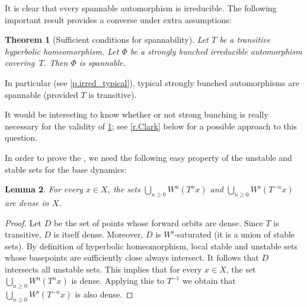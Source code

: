 \documentclass[JEP,XML,SOM,Unicode]{cedram}
\theoremstyle{plain}
\newtheorem{theorem}{Theorem}[section]
\newtheorem{lemma}[theorem]{Lemma}
\theoremstyle{definition}
\newcommand{\uu}{\mathrm{u}}
\renewcommand{\ss}{\mathrm{s}}
\begin{document}
It is clear that every spannable automorphism is irreducible.
The following important result provides a converse under extra assumptions:

\begin{theorem}[Sufficient conditions for spannability]\label{t.irr_to_span}
Let $T$ be a transitive hyperbolic homeomorphism.
Let $\Phi$ be a strongly bunched irreducible automorphism covering~$T$.
Then $\Phi$ is spannable.
\end{theorem}

In particular (see \cref{p.irred_typical}), typical strongly bunched automorphisms are spannable (provided $T$ is transitive).

It would be interesting to know whether or not strong bunching is really necessary for the validity of \cref{t.irr_to_span}; see \cref{r.Clark} below for a possible approach to this question.

In order to prove the , we need the following easy property of the unstable and stable sets for the base dynamics:

\begin{lemma}\label{l.transitive}
For every $x \in X$, the sets $\bigcup_{n \ge 0} W^\uu(T^n x)$ and $\bigcup_{n \ge 0} W^\ss(T^{-n} x)$ are dense in $X$.
\end{lemma}

\begin{proof}
Let $D$ be the set of points whose forward orbits are dense.
Since $T$ is transitive, $D$ is itself dense.
Moreover, $D$ is $W^\ss$-saturated (\ie it is a union of stable sets).
By definition of hyperbolic homeomorphism, local stable and unstable sets whose basepoints are sufficiently close always intersect.
It follows that $D$ intersects all unstable sets.
This implies that for every $x \in X$, the set $\bigcup_{n \ge 0} W^\uu(T^n x)$ is dense.
Applying this to $T^{-1}$ we obtain that $\bigcup_{n \ge 0} W^\ss(T^{-n} x)$ is also dense.
\end{proof}
\end{document}
